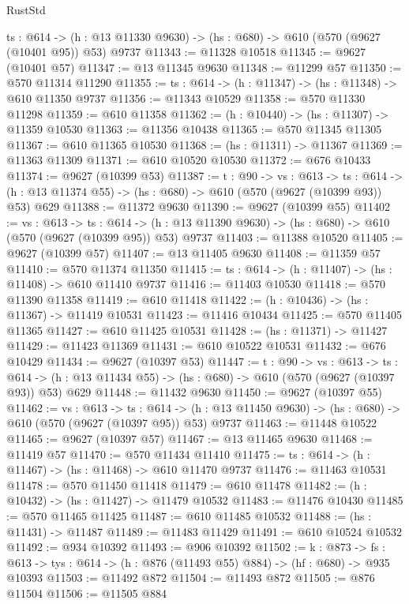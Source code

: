 \begin{lexlean}{RustStd}
\begin{coremodule}
  {ts : @614} -> (h : @13 @11330 @9630) -> (hs : @680) -> @610 (@570 (@9627 (@10401 @95)) @53) @9737
@11343 := @11328 @10518
@11345 := @9627 (@10401 @57)
@11347 := @13 @11345 @9630
@11348 := @11299 @57
@11350 := @570 @11314 @11290
@11355 := {ts : @614} -> (h : @11347) -> (hs : @11348) -> @610 @11350 @9737
@11356 := @11343 @10529
@11358 := @570 @11330 @11298
@11359 := @610 @11358
@11362 := (h : @10440) -> (hs : @11307) -> @11359 @10530
@11363 := @11356 @10438
@11365 := @570 @11345 @11305
@11367 := @610 @11365 @10530
@11368 := (hs : @11311) -> @11367
@11369 := @11363 @11309
@11371 := @610 @10520 @10530
@11372 := @676 @10433
@11374 := @9627 (@10399 @53)
@11387 := {t : @90} ->
  {vs : @613} ->
  {ts : @614} -> (h : @13 @11374 @55) -> (hs : @680) -> @610 (@570 (@9627 (@10399 @93)) @53) @629
@11388 := @11372 @9630
@11390 := @9627 (@10399 @55)
@11402 := {vs : @613} ->
  {ts : @614} -> (h : @13 @11390 @9630) -> (hs : @680) -> @610 (@570 (@9627 (@10399 @95)) @53) @9737
@11403 := @11388 @10520
@11405 := @9627 (@10399 @57)
@11407 := @13 @11405 @9630
@11408 := @11359 @57
@11410 := @570 @11374 @11350
@11415 := {ts : @614} -> (h : @11407) -> (hs : @11408) -> @610 @11410 @9737
@11416 := @11403 @10530
@11418 := @570 @11390 @11358
@11419 := @610 @11418
@11422 := (h : @10436) -> (hs : @11367) -> @11419 @10531
@11423 := @11416 @10434
@11425 := @570 @11405 @11365
@11427 := @610 @11425 @10531
@11428 := (hs : @11371) -> @11427
@11429 := @11423 @11369
@11431 := @610 @10522 @10531
@11432 := @676 @10429
@11434 := @9627 (@10397 @53)
@11447 := {t : @90} ->
  {vs : @613} ->
  {ts : @614} -> (h : @13 @11434 @55) -> (hs : @680) -> @610 (@570 (@9627 (@10397 @93)) @53) @629
@11448 := @11432 @9630
@11450 := @9627 (@10397 @55)
@11462 := {vs : @613} ->
  {ts : @614} -> (h : @13 @11450 @9630) -> (hs : @680) -> @610 (@570 (@9627 (@10397 @95)) @53) @9737
@11463 := @11448 @10522
@11465 := @9627 (@10397 @57)
@11467 := @13 @11465 @9630
@11468 := @11419 @57
@11470 := @570 @11434 @11410
@11475 := {ts : @614} -> (h : @11467) -> (hs : @11468) -> @610 @11470 @9737
@11476 := @11463 @10531
@11478 := @570 @11450 @11418
@11479 := @610 @11478
@11482 := (h : @10432) -> (hs : @11427) -> @11479 @10532
@11483 := @11476 @10430
@11485 := @570 @11465 @11425
@11487 := @610 @11485 @10532
@11488 := (hs : @11431) -> @11487
@11489 := @11483 @11429
@11491 := @610 @10524 @10532
@11492 := @934 @10392
@11493 := @906 @10392
@11502 := {k : @873} ->
  {fs : @613} -> {tys : @614} -> (h : @876 (@11493 @55) @884) -> (hf : @680) -> @935 @10393
@11503 := @11492 @872
@11504 := @11493 @872
@11505 := @876 @11504
@11506 := @11505 @884

\end{coremodule}
\end{lexlean}
